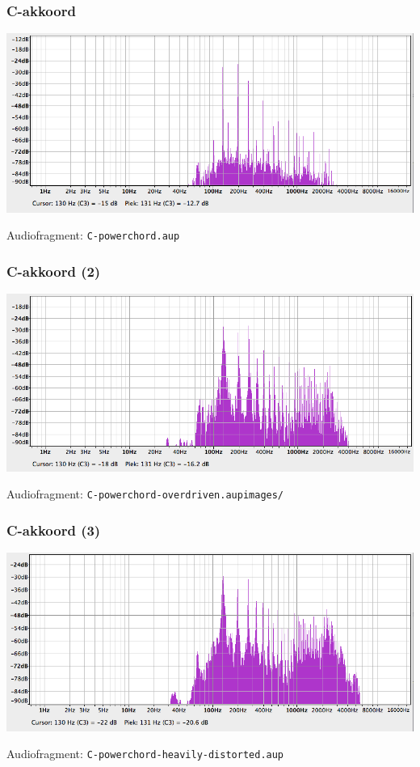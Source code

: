 \documentclass[compress, darktitle, framenumber]{beamer}
\begin{document}
\begin{frame}
\frametitle{C-akkoord}
\includegraphics[width=\textwidth]{images/C-powerchord.png}
\begin{block}{Audiofragment:}
\texttt{C-powerchord.aup}
\end{block}
\end{frame}

\begin{frame}
\frametitle{C-akkoord (2)}
\includegraphics[width=\textwidth]{images/C-powerchord-overdriven.png}
\begin{block}{Audiofragment:}
\texttt{C-powerchord-overdriven.aupimages/}
\end{block}
\end{frame}

\begin{frame}
\frametitle{C-akkoord (3)}
\includegraphics[width=\textwidth]{images/C-powerchord-heavily-distorted.png}
\begin{block}{Audiofragment:}
\texttt{C-powerchord-heavily-distorted.aup} 
\end{block}
\end{frame}
\end{document}
